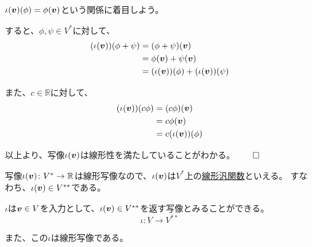 \documentclass[../../../topic_linear-algebra]{subfiles}
\begin{document}
\br

\begin{handout}
  $\iota(\vb*{v})(\phi) = \phi(\vb*{v})$という関係に着目しよう。
  
  \br
  
  すると、$\phi, \psi \in V^*$に対して、
  \begin{align*}
    (\iota(\vb*{v}))(\phi + \psi) &= (\phi + \psi)(\vb*{v}) \\
    &= \phi(\vb*{v}) + \psi(\vb*{v}) \\
    &= (\iota(\vb*{v}))(\phi) + (\iota(\vb*{v}))(\psi)
  \end{align*}
  
  また、$c \in \mathbb{R}$に対して、
  \begin{align*}
    (\iota(\vb*{v})) (c\phi) &= (c\phi)(\vb*{v}) \\
    &= c \phi(\vb*{v}) \\
    &= c (\iota(\vb*{v}))(\phi)
  \end{align*}
  
  以上より、写像$\iota(\vb*{v})$は線形性を満たしていることがわかる。$\qed$
\end{handout}

写像$\iota(\vb*{v}) \colon V^* \to \mathbb{R}$は線形写像なので、$\iota(\vb*{v})$は$V^*$上の\hyperref[def:linear-functional]{線形汎関数}といえる。
すなわち、$\iota(\vb*{v}) \in V^{**}$である。

\br

$\iota$は$\vb*{v} \in V$を入力として、$\iota(\vb*{v}) \in V^{**}$を返す写像とみることができる。
\begin{equation*}
  \iota \colon V \to V^{**}
\end{equation*}

また、この$\iota$は線形写像である。

\br
\end{document}
